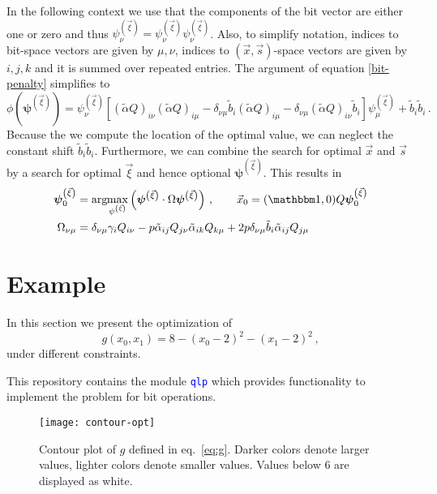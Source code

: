 \documentclass[]{article}
\newcommand{\argmax}[1]{\text{arg}\hspace{-2pt}\max\limits_{#1}}
\newcommand{\bvec}[1]{\boldsymbol{#1}}
\newcommand{\codeword}[1]{\texttt{\textcolor{blue}{\lstinline{#1}}}
}
\begin{document}
In the following context we use that the components of the bit vector are either one or zero and thus $\psi^{\left( \vec \xi \right)}_\nu = \psi^{\left( \vec \xi \right)}_\nu \psi^{\left( \vec \xi \right)}_\nu$.
Also, to simplify notation, indices to bit-space vectors are given by $\mu, \nu$, indices to $(\vec x, \vec s)$-space vectors are given by $i, j, k$ and it is summed over repeated entries.
The argument of equation \eqref{bit-penalty} simplifies to
\begin{equation}
	\label{eq:constraint-matrix}
	\phi\left(\bvec \psi^{\left( \vec \xi \right)}\right)
	=
	\psi^{\left( \vec \xi \right)}_\nu
	\left[
		(\tilde \alpha Q)_{i\nu} (\tilde \alpha Q)_{i\mu}
		-  \delta_{\nu\mu}\tilde{b}_i (\tilde \alpha Q)_{i\mu}
		- \delta_{\nu\mu} (\tilde \alpha Q)_{i\nu} \tilde{b}_i
	\right]
	\psi^{\left( \vec \xi \right)}_\mu
	+ \tilde{b}_i \tilde{b}_i \, .
\end{equation}
Because the we compute the location of the optimal value, we can neglect the constant shift $\tilde{b}_i \tilde{b}_i$.
Furthermore, we can combine the search for optimal $\vec x$ and $\vec s$ by a search for optimal $\vec \xi$ and hence optional $\bvec \psi^{\left( \vec \xi \right)}$.
This results in
\begin{align}
	\bvec \psi^{\left( \vec \xi \right)}_{0} 
	&=
	\argmax{\psi^{\left( \vec \xi \right)}}\left( 
		\bvec \psi^{\left( \vec \xi \right)} \cdot \Omega \bvec \psi^{\left( \vec \xi \right)}
	\right)
	\, , \qquad
	\vec x_0 =  (\mathbbm 1, 0) Q \bvec \psi^{\left( \vec \xi \right)}_{0} 
	\\
	\Omega_{\nu\mu}
	&=
	\delta_{\nu\mu} \gamma_i Q_{i\nu}
	- p \tilde \alpha_{ij} Q_{j\nu} \tilde \alpha_{ik} Q_{k\mu}
	+ 2 p \delta_{\nu\mu}\tilde{b}_i \tilde \alpha_{ij} Q_{j\mu}
\end{align}

\section{Example}
In this section we present the optimization of
\begin{equation}
	\label{eq:g}
	g(x_0, x_1) = 8 -(x_0 - 2)^2 - (x_1 - 2)^2 \, ,
\end{equation}
under different constraints.

This repository contains the module \codeword{qlp} which provides functionality to implement the problem for bit operations.

\begin{figure}
	\centering
	\texttt{[image: contour-opt]}
	\caption{
		\label{fig:g}
		Contour plot of $g$ defined in eq.~\eqref{eq:g}.
		Darker colors denote larger values, lighter colors denote smaller values.
		Values below $6$ are displayed as white.
	}
\end{figure}
\end{document}
